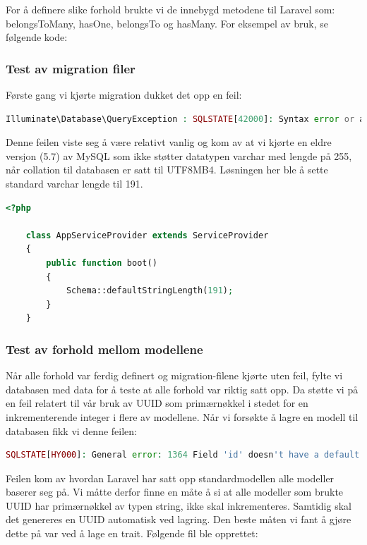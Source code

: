For å definere slike forhold brukte vi de innebygd metodene til Laravel som: belongsToMany, hasOne, belongsTo og hasMany. For eksempel av bruk, se følgende kode:


\subsubsection{Test av migration filer}
Første gang vi kjørte migration dukket det opp en feil:
\begin{lstlisting}[caption={Feilmelding i Laravel ved kjøring av migration},language=PHP]
Illuminate\Database\QueryException : SQLSTATE[42000]: Syntax error or access violation: 1071 Specified key was too long; max key length is 767 bytes (SQL: alter table `users` add unique `users_email_unique`(`email`))
\end{lstlisting}
Denne feilen viste seg å være relativt vanlig og kom av at vi kjørte en eldre versjon (5.7) av MySQL som ikke støtter datatypen varchar med lengde på 255, når collation til databasen er satt til UTF8MB4. Løsningen her ble å sette standard varchar lengde til 191.
\begin{lstlisting}[language=PHP, caption={Definering av standard varchar lengde i AppServiceProvider.php}]
    <?php

    class AppServiceProvider extends ServiceProvider
    {
        public function boot()
        {
            Schema::defaultStringLength(191);
        }
    }
\end{lstlisting}

\subsubsection{Test av forhold mellom modellene}
Når alle forhold var ferdig definert og migration-filene kjørte uten feil, fylte vi databasen med data for å teste at alle forhold var riktig satt opp. Da støtte vi på en feil relatert til vår bruk av UUID som primærnøkkel i stedet for en inkrementerende integer i flere av modellene. Når vi forsøkte å lagre en modell til databasen fikk vi denne feilen:
\begin{lstlisting}[language=PHP]
    SQLSTATE[HY000]: General error: 1364 Field 'id' doesn't have a default value ...
\end{lstlisting}

Feilen kom av hvordan Laravel har satt opp standardmodellen alle modeller baserer seg på. Vi måtte derfor finne en måte å si at alle modeller som brukte UUID har primærnøkkel av typen string, ikke skal inkrementeres. Samtidig skal det genereres en UUID automatisk ved lagring. Den beste måten vi fant å gjøre dette på var ved å lage en trait. Følgende fil ble opprettet:


